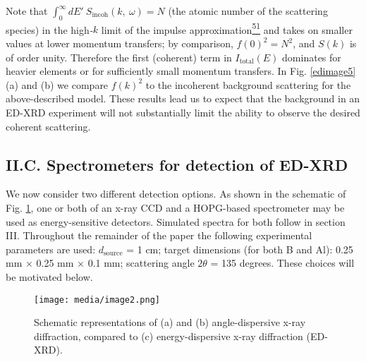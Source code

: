 Note that
\(\int_{0}^{\infty}{dE'}\ S_{\text{incoh}}\left( k,\ \omega \right) = N\)
(the atomic number of the scattering species) in the high\emph{-}\(k\)
limit of the impulse
approximation\hyperref[p.-eisenberger-and-p.-m.-platzman-physical-review-a-2-415-1970.]{\textsuperscript{51}}
and takes on smaller values at lower momentum transfers; by comparison,
\({f(0)}^{2} = N^{2}\), and \(S(k)\) is of order unity. Therefore the
first (coherent) term in \(I_{\text{total}}\left( E \right)\) dominates
for heavier elements or for sufficiently small momentum transfers. In
Fig. \ref{edimage5} (a) and (b) we compare \({f(k)}^{2}\) to the incoherent
background scattering for the above-described model. These results lead
us to expect that the background in an ED-XRD experiment will not
substantially limit the ability to observe the desired coherent
scattering.

\subsection{II.C. Spectrometers for detection of ED-XRD}

We now consider two different detection options. As shown in the
schematic of Fig. \ref{edimage2}, one or both of an x-ray CCD and a HOPG-based
spectrometer may be used as energy-sensitive detectors. Simulated
spectra for both follow in section III. Throughout the remainder of the
paper the following experimental parameters are used:
\(d_{\text{source}}\) = 1 cm; target dimensions (for both B and Al):
0.25 mm × 0.25 mm × 0.1 mm; scattering angle \(2\theta\) = 135 degrees.
These choices will be motivated below.

\begin{figure}[h] 
\caption{ Schematic representations of (a) and (b) angle-dispersive
x-ray diffraction, compared to (c) energy-dispersive x-ray diffraction
(ED-XRD).}
\label{edimage2}
\centering
\texttt{[image: media/image2.png]}
\end{figure}

